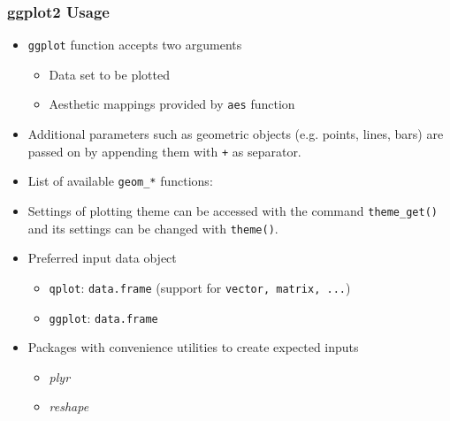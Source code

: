 \documentclass{beamer}
\newcommand{\Rfunction}[1]{{\texttt{#1}}}
\newcommand{\Robject}[1]{{\texttt{#1}}}
\newcommand{\Rpackage}[1]{{\textit{#1}}}
\begin{document}
\begin{frame}[containsverbatim]  
	\frametitle{ggplot2 Usage}
\begin{itemize}
	\item \Rfunction{ggplot} function accepts two arguments
        \begin{itemize}
		\item Data set to be plotted 
		\item Aesthetic mappings provided by \Rfunction{aes} function
        \end{itemize}
	\item Additional parameters such as geometric objects (e.g. points, lines, bars) are passed on by appending them with \Rfunction{+} as separator. 
	\item List of available \Rfunction{geom\_*} functions: \href{http://docs.ggplot2.org/current/}{{}} 
	\item Settings of plotting theme can be accessed with the command \Rfunction{theme\_get()} and its settings can be changed with \Rfunction{theme()}. 
	\item Preferred input data object 
        \begin{itemize}
		\item \Rfunction{qplot}: \Robject{data.frame} (support for \Robject{vector, matrix, ...})
		\item \Rfunction{ggplot}: \Robject{data.frame}
        \end{itemize}
	\item Packages with convenience utilities to create expected inputs
        \begin{itemize}
		\item \Rpackage{plyr} 
		\item \Rpackage{reshape}
        \end{itemize}
\end{itemize}
\end{frame}
\end{document}
